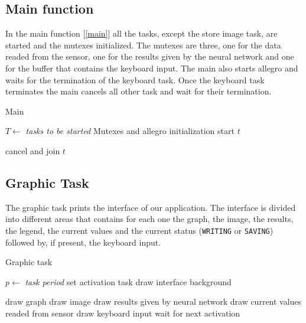 \documentclass[12pt]{article}
\begin{document}
\subsection{Main function}
In the main function [\ref{main}] all the tasks, except the store image task,
are started and the mutexes initialized. The mutexes are three, one for the
data readed from the sensor, one for the results given by the neural
network and one for the buffer that contains the keyboard input. The main also 
starts allegro and waits for the termination of the
keyboard task. Once the keyboard task terminates the main cancels all other
task and wait for their termination.

\begin{algorithm}[t]
\caption{Main}
\label{main}

\begin{algorithmic}
\State $T\gets$ \textit{tasks to be started}
\State Mutexes and allegro initialization
    \State start $t$
\EndFor

\EndLoop

    \State cancel and join $t$
\EndFor

\end{algorithmic}
\end{algorithm}

\subsection{Graphic Task}

The graphic task prints the interface of our application. The
interface is divided into different areas that contains for each one the
graph, the image, the results, the legend, the current values and the current
status (\texttt{WRITING} or \texttt{SAVING}) followed by, if present, the
keyboard input.

\begin{algorithm}[t]
\caption{Graphic task}
\label{graphic}
\begin{algorithmic}
\State $p\gets$ \textit{task period}
\State set activation task
\State draw interface background

\Loop
\State draw graph
\State draw image
\State draw results given by neural network
\State draw current values readed from sensor
\State draw keyboard input
\State wait for next activation
\EndLoop

\end{algorithmic}
\end{algorithm}
\end{document}
